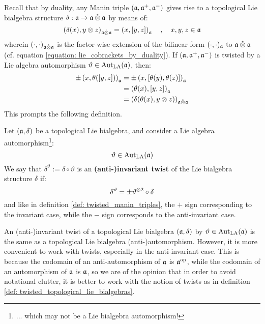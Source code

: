         Recall that by duality, any Manin triple $(\mathfrak{a}, \mathfrak{a}^+, \mathfrak{a}^-)$ gives rise to a topological Lie bialgebra structure $\delta: \a \to \a \hattensor \a$ by means of:
            $$\left( \delta(x), y \tensor z \right)_{\a \hattensor \a} = \left( x, [y, z] \right)_{\a} \quad, \quad x, y, z \in \a$$
        wherein $(\cdot, \cdot)_{\a \hattensor \a}$ is the factor-wise extension of the bilinear form $(\cdot, \cdot)_{\mathfrak{a}}$ to $\a \hattensor \a$ (cf. equation \eqref{equation: lie_cobrackets_by_duality}). If $(\mathfrak{a}, \mathfrak{a}^+, \mathfrak{a}^-)$ is twisted by a Lie algebra automorphism $\vartheta \in \operatorname{Aut}_{\mathrm{LA}}(\mathfrak{a})$, then:
            \begin{equation} \label{equation: twisted_lie_cobrackets_by_duality}
                \begin{aligned}
                    \pm \left( x, \theta([y, z]) \right)_{\a} & = \pm \left( x, [\theta(y), \theta(z)] \right)_{\a}
                    \\
                    & = \left( \theta(x), [y, z] \right)_{\a}
                    \\
                    & = \left( \delta( \theta(x), y \tensor z ) \right)_{\a \hattensor \a}
                \end{aligned}
            \end{equation}
        This prompts the following definition.
        \begin{definition} \label{def: twisted_topological_lie_bialgebras}
            Let $(\mathfrak{a}, \delta)$ be a topological Lie bialgebra, and consider a Lie algebra automorphism\footnote{... which may not be a Lie bialgebra automorphism!}:
                $$\vartheta \in \operatorname{Aut}_{\mathrm{LA}}(\mathfrak{a})$$
            We say that $\delta^{\vartheta} := \delta \circ \vartheta$ is an \textbf{(anti-)invariant twist} of the Lie bialgebra structure $\delta$ if:
                $$\delta^{\vartheta} = \pm \vartheta^{\tensor 2} \circ \delta$$
            and like in definition \ref{def: twisted_manin_triples}, the $+$ sign corresponding to the invariant case, while the $-$ sign corresponds to the anti-invariant case.
        \end{definition}
        \begin{remark}
            An (anti-)invariant twist of a topological Lie bialgebra $(\mathfrak{a}, \delta)$ by $\vartheta \in \operatorname{Aut}_{\mathrm{LA}}(\mathfrak{a})$ is the same as a topological Lie bialgebra (anti-)automorphism. However, it is more convenient to work with twists, especially in the anti-invariant case. This is because the codomain of an anti-automorphism of $\mathfrak{a}$ is $\mathfrak{a}^{\mathrm{op}}$, while the codomain of an automorphism of $\mathfrak{a}$ is $\mathfrak{a}$, so we are of the opinion that in order to avoid notational clutter, it is better to work with the notion of twists as in definition \ref{def: twisted_topological_lie_bialgebras}.
        \end{remark}
